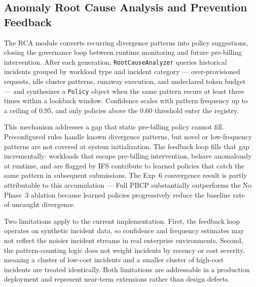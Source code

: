 
\subsection{Anomaly Root Cause Analysis and Prevention Feedback}

The RCA module converts recurring divergence patterns into policy suggestions,
closing the governance loop between runtime monitoring and future pre-billing
intervention. After each generation, \texttt{RootCauseAnalyzer} queries
historical incidents grouped by workload type and incident category ---
over-provisioned requests, idle cluster patterns, runaway execution, and
undeclared token budget --- and synthesizes a \texttt{Policy} object when the
same pattern recurs at least three times within a lookback window. Confidence
scales with pattern frequency up to a ceiling of 0.95, and only policies above
the 0.60 threshold enter the registry.

This mechanism addresses a gap that static pre-billing policy cannot fill.
Preconfigured rules handle known divergence patterns, but novel or low-frequency
patterns are not covered at system initialization. The feedback loop fills that
gap incrementally: workloads that escape pre-billing intervention, behave
anomalously at runtime, and are flagged by IFS contribute to learned policies
that catch the same pattern in subsequent submissions. The Exp~6 convergence
result is partly attributable to this accumulation --- Full PBCP substantially
outperforms the No Phase~3 ablation because learned policies progressively
reduce the baseline rate of uncaught divergence.

Two limitations apply to the current implementation. First, the feedback loop
operates on synthetic incident data, so confidence and frequency estimates may
not reflect the noisier incident streams in real enterprise environments. Second,
the pattern-counting logic does not weight incidents by recency or cost severity,
meaning a cluster of low-cost incidents and a smaller cluster of high-cost
incidents are treated identically. Both limitations are addressable in a
production deployment and represent near-term extensions rather than design
defects.
